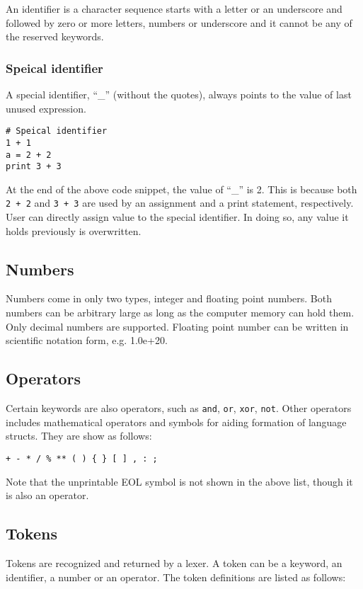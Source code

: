 \documentclass[10pt,a4paper]{article}
\begin{document}
An identifier is a character sequence starts with a letter or an underscore 
and followed by zero or more letters, numbers or underscore and it cannot
be any of the reserved keywords.

\subsubsection{Speical identifier}
A special identifier, ``_'' (without the quotes), always points
to the value of last unused expression.
\begin{lstlisting}
# Speical identifier
1 + 1
a = 2 + 2
print 3 + 3
\end{lstlisting}
At the end of the above code snippet, the value of ``_'' is 2. This is because 
both \lstinline$2 + 2$ and \lstinline$3 + 3$ are used by an assignment and
a print statement, respectively. User can directly assign value to the special
identifier. In doing so, any value it holds previously is overwritten.

\subsection{Numbers}
Numbers come in only two types, integer and floating point numbers.
Both numbers can be arbitrary large as long as the computer memory
can hold them. Only decimal numbers are supported. Floating point
number can be written in scientific notation form, e.g. 1.0e+20.

\subsection{Operators}
Certain keywords are also operators, such as \lstinline$and$, 
\lstinline$or$, \lstinline$xor$, \lstinline$not$. Other operators
includes mathematical operators and symbols for aiding formation
of language structs. They are show as follows:
\begin{lstlisting}
+ - * / % ** ( ) { } [ ] , : ;
\end{lstlisting}
Note that the unprintable EOL symbol is not shown in the above list,
though it is also an operator. 

\subsection{Tokens}
Tokens are recognized and returned by a lexer. A token can be a keyword,
an identifier, a number or an operator. The token definitions are listed
as follows:
\end{document}
